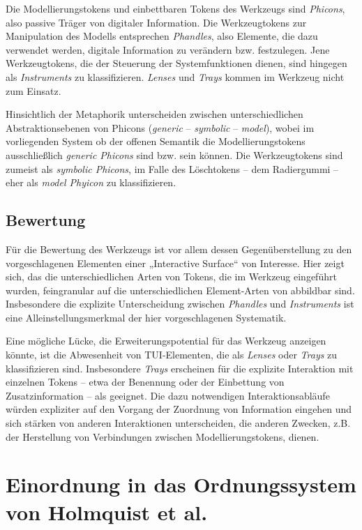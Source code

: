 Die Modellierungstokens und einbettbaren Tokens des Werkzeugs sind \emph{Phicons}, also passive Träger von digitaler Information. Die Werkzeugtokens zur Manipulation des Modells entsprechen \emph{Phandles}, also Elemente, die dazu verwendet werden, digitale Information zu verändern bzw. festzulegen. Jene Werkzeugtokens, die der Steuerung der Systemfunktionen dienen, sind hingegen als \emph{Instruments} zu klassifizieren. \emph{Lenses} und \emph{Trays} kommen im Werkzeug nicht zum Einsatz.

Hinsichtlich der Metaphorik unterscheiden \citet{Ullmer97} zwischen unterschiedlichen Abstraktionsebenen von Phicons (\emph{generic} -- \emph{symbolic} -- \emph{model}), wobei im vorliegenden System ob der offenen Semantik die Modellierungstokens ausschließlich \emph{generic Phicons} sind bzw. sein können. Die Werkzeugtokens sind zumeist als \emph{symbolic Phicons}, im Falle des Löschtokens -- dem Radiergummi -- eher als \emph{model Phyicon} zu klassifizieren.

\subsection{Bewertung} %

Für die Bewertung des Werkzeugs ist vor allem dessen Gegenüberstellung zu den vorgeschlagenen Elementen einer „Interactive Surface“ von Interesse. Hier zeigt sich, das die unterschiedlichen Arten von Tokens, die im Werkzeug eingeführt wurden, feingranular auf die unterschiedlichen Element-Arten von \citep{Ishii97} abbildbar sind. Insbesondere die explizite Unterscheidung zwischen \emph{Phandles} und \emph{Instruments} ist eine Alleinstellungsmerkmal der hier vorgeschlagenen Systematik.

Eine mögliche Lücke, die Erweiterungspotential für das Werkzeug anzeigen könnte, ist die Abwesenheit von TUI-Elementen, die als \emph{Lenses} oder \emph{Trays} zu klassifizieren sind. Insbesondere \emph{Trays} erscheinen für die explizite Interaktion mit einzelnen Tokens -- etwa der Benennung oder der Einbettung von Zusatzinformation -- als geeignet. Die dazu notwendigen Interaktionsabläufe würden expliziter auf den Vorgang der Zuordnung von Information eingehen und sich stärken von anderen Interaktionen unterscheiden, die anderen Zwecken, z.B. der Herstellung von Verbindungen zwischen Modellierungstokens, dienen.

\section{Einordnung in das Ordnungssystem von Holmquist et al.}

